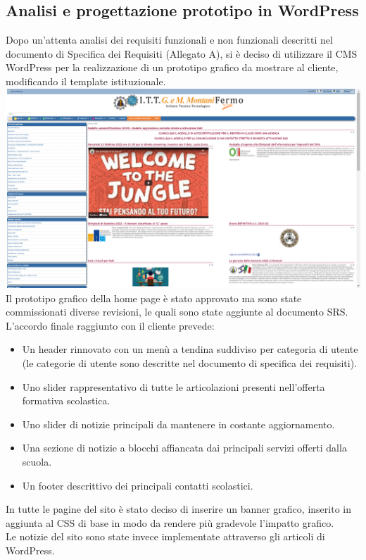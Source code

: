 \documentclass{article}
\begin{document}
	\subsection{\textbf{Analisi e progettazione prototipo in WordPress}}
	Dopo un'attenta analisi dei requisiti funzionali e non funzionali descritti nel documento di Specifica dei Requisiti (Allegato A), si è deciso di utilizzare il CMS WordPress per la realizzazione di un prototipo grafico da mostrare al cliente, modificando il template istituzionale. 
	\includegraphics[scale=0.18]{ittmontaniex.png}
	Il prototipo grafico della home page è stato approvato ma sono state commissionati diverse revisioni, le quali sono state aggiunte al documento SRS. L'accordo finale raggiunto con il cliente prevede:
	\begin{itemize}
	    \item Un header rinnovato con un menù a tendina suddiviso per categoria di utente (le categorie di utente sono descritte nel documento di specifica dei requisiti).
	    \item Uno slider rappresentativo di tutte le articolazioni presenti nell'offerta formativa scolastica.
	    \item Uno slider di notizie principali da mantenere in costante aggiornamento.
	    \item Una sezione di notizie a blocchi affiancata dai principali servizi offerti dalla scuola.
	    \item Un footer descrittivo dei principali contatti scolastici.
	\end{itemize}
	In tutte le pagine del sito è stato deciso di inserire un banner grafico, inserito in aggiunta al CSS di base in modo da rendere più gradevole l'impatto grafico. \\
	Le notizie del sito sono state invece implementate attraverso gli articoli di WordPress.\\
	
\end{document}
